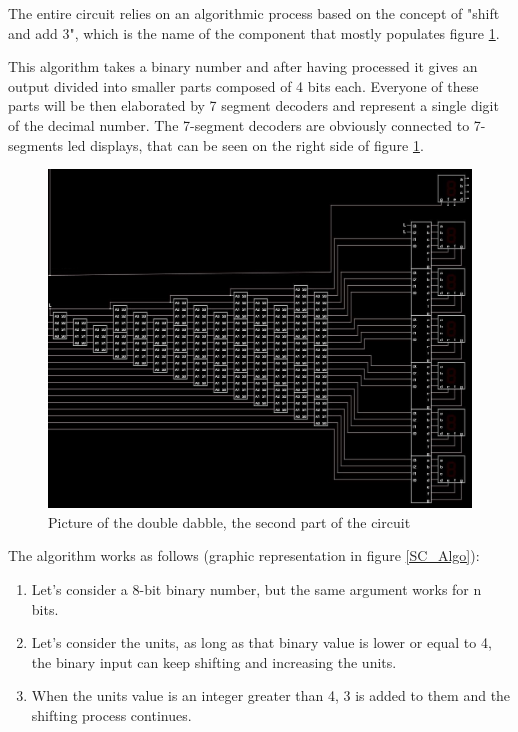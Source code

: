 \documentclass{article}
\begin{document}
The entire circuit relies on an algorithmic process based on the concept of "shift and add 3", which is the name of the component that mostly populates figure \ref{DoubleDabble}.

This algorithm takes a binary number and after having processed it gives an output divided into smaller parts composed of 4 bits each. Everyone of these parts will be then elaborated by 7 segment decoders and represent a single digit of the decimal number. The 7-segment decoders are obviously connected to 7-segments led displays, that can be seen on the right side of figure \ref{DoubleDabble}.

\begin{figure}[h]
    \centering
    \includegraphics[scale=0.43]{SC_DoubleDabble.JPG}
    \caption{Picture of the double dabble, the second part of the circuit}
    \label{DoubleDabble}
  \end{figure}


The algorithm works as follows (graphic representation in figure \ref{SC_Algo}):
\begin{enumerate}
  \item Let's consider a 8-bit binary number, but the same argument works for n bits. 
  \item Let's consider the units, as long as that binary value is lower or equal to 4, the binary input can keep shifting and increasing the units.
  \item When the units value is an integer greater than 4, 3 is added to them and the shifting process continues.
\end{enumerate}
\end{document}
